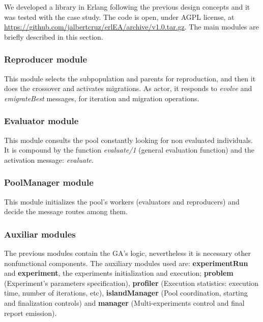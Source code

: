 
We developed a library in Erlang following the previous design concepts and it was tested with the case study. The code is open, under AGPL license, at \url{https://github.com/jalbertcruz/erlEA/archive/v1.0.tar.gz}. The main modules are briefly described in this section.
\subsubsection{Reproducer module}

This module selects the subpopulation and parents for reproduction, and then it does the crossover and activates migrations. As actor, it responds to {\em evolve} and {\em emigrateBest} messages, for iteration and migration operations.

\subsubsection{Evaluator module}

This module consults the pool constantly looking for non evaluated individuals. It is compound by the function {\em evaluate/1} (general evaluation function) and the activation message: {\em evaluate}.

\subsubsection{PoolManager module}

This module initializes the pool’s workers (evaluators and reproducers) and decide the message routes among them.

\subsubsection{Auxiliar modules}

The previous modules contain the GA’s logic, nevertheless it is necessary other nonfunctional components. The auxiliary modules used are: \textbf{experimentRun} and \textbf{experiment}, the experiments initialization and execution; \textbf{problem} (Experiment’s parameters specification), \textbf{profiler} (Execution statistics: execution time, number of iterations, etc), \textbf{islandManager} (Pool coordination, starting and finalization controls) and \textbf{manager} (Multi-experiments control and final report emission).

